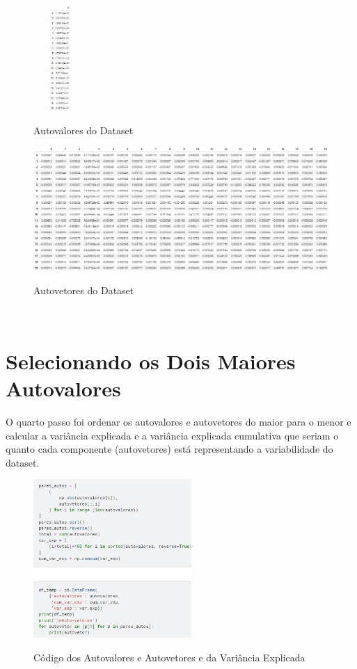 \documentclass{report}
\begin{document}
\begin{figure}[H]
\centering
\caption{Autovalores do Dataset}
\includegraphics[width=2cm, height=4cm]{figures/autovalores.jpg}
\label{figura com os autovalores}
\end{figure}

\begin{figure}[H]
\centering
\caption{Autovetores do Dataset}
\includegraphics[width=12cm]{figures/autovetores.jpg}
\label{figura com os autovetores}
\end{figure}
\
\section{Selecionando os Dois Maiores Autovalores}
O quarto passo foi ordenar os autovalores e autovetores do maior para o menor e calcular a variância explicada e a variância explicada cumulativa que seriam o quanto cada componente (autovetores) está representando a variabilidade do dataset.

\begin{figure}[H]
\centering
\caption{Código dos Autovalores e Autovetores e da Variância Explicada}
\includegraphics[width=6cm]{figures/cod_var_exp.jpg}
\label{figura com o código dos autovalores e autovetores e da variância explicada}
\end{figure}
\end{document}
